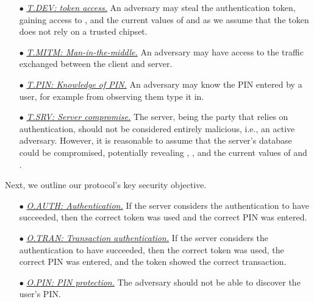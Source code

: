 \begin{itemize}[leftmargin=3.2mm]
\item[$\bullet$]\underline{\textit{T.DEV: token access.}} An adversary may steal the authentication token,  gaining access to , \VC{\salt} and the current values of \VC{\counter} and \VC{\state} as we assume that the token does not rely on a trusted chipset. 


\item[$\bullet$]\underline{\textit{T.MITM: Man-in-the-middle.}} An adversary may have access to the traffic exchanged between the client and server.

\item[$\bullet$]\underline{\textit{T.PIN: Knowledge of PIN.}} An adversary may know the PIN entered by a user, for example from observing them type it in.

\item[$\bullet$]\underline{\textit{T.SRV: Server compromise.}}  The server, being the party that relies on authentication, should not be considered entirely malicious, i.e., an active adversary. However, it is reasonable to assume that the server's database could be compromised, potentially revealing , \VS{\verifier}, and the current values of \VC{\counter} and \VC{\state}.


\end{itemize}



Next, we outline our protocol's key security objective.

\begin{itemize}[leftmargin=3.2mm]
\item[$\bullet$]\underline{\textit{O.AUTH: Authentication.}} If the server considers the authentication to have succeeded,  then the correct token was used and the correct PIN was entered.

\item[$\bullet$]\underline{\textit{O.TRAN: Transaction authentication.}} If the server considers the authentication to have succeeded, then the correct token was used, the correct PIN was entered, and the token showed the correct transaction.

\item[$\bullet$]\underline{\textit{O.PIN: PIN protection.}} The adversary should not be able to discover the user's PIN. 
\end{itemize}


